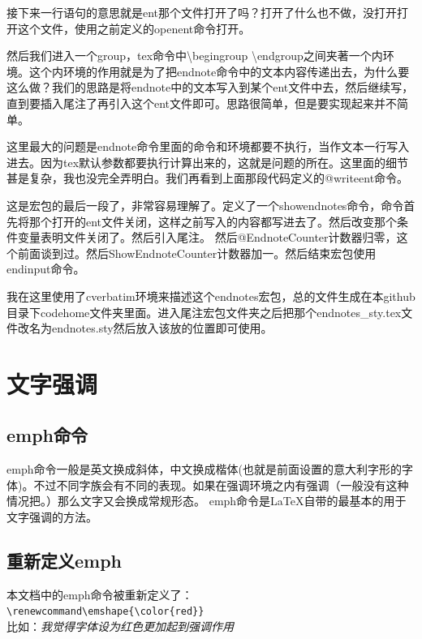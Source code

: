 \documentclass[11pt,oneside]{book}
\begin{document}
\begin{common-format}
接下来一行语句的意思就是ent那个文件打开了吗？打开了什么也不做，没打开打开这个文件，使用之前定义的openent命令打开。

然后我们进入一个group，tex命令中\textbackslash begingroup \textbackslash endgroup之间夹著一个内环境。这个内环境的作用就是为了把endnote命令中的文本内容传递出去，为什么要这么做？我们的思路是将endnote中的文本写入到某个ent文件中去，然后继续写，直到要插入尾注了再引入这个ent文件即可。思路很简单，但是要实现起来并不简单。

这里最大的问题是endnote命令里面的命令和环境都要不执行，当作文本一行写入进去。因为tex默认参数都要执行计算出来的，这就是问题的所在。这里面的细节甚是复杂，我也没完全弄明白。我们再看到上面那段代码定义的@writeent命令。


这是宏包的最后一段了，非常容易理解了。定义了一个showendnotes命令，命令首先将那个打开的ent文件关闭，这样之前写入的内容都写进去了。然后改变那个条件变量表明文件关闭了。然后引入尾注。
然后@EndnoteCounter计数器归零，这个前面谈到过。然后ShowEndnoteCounter计数器加一。然后结束宏包使用endinput命令。

我在这里使用了cverbatim环境来描述这个endnotes宏包，总的文件生成在本github目录下codehome文件夹里面。进入尾注宏包文件夹之后把那个endnotes\_{}sty.tex文件改名为endnotes.sty然后放入该放的位置即可使用。



\section{文字强调}
\subsection{emph命令}
emph命令一般是英文换成斜体，中文换成楷体(也就是前面设置的意大利字形的字体)。不过不同字族会有不同的表现。如果在强调环境之内有强调（一般没有这种情况把。）那么文字又会换成常规形态。
emph命令是\LaTeX 自带的最基本的用于文字强调的方法。


\subsection{重新定义emph}
本文档中的emph命令被重新定义了：\\
\verb+\renewcommand\emshape{\color{red}}+\\
比如：\emph{我觉得字体设为红色更加起到强调作用}


\end{common-format}
\end{document}
